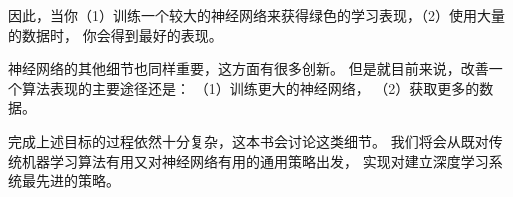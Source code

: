 因此，当你（1）训练一个较大的神经网络来获得绿色的学习表现，（2）使用大量的数据时， 你会得到最好的表现。

神经网络的其他细节也同样重要，这方面有很多创新。
但是就目前来说，改善一个算法表现的主要途径还是：
（1）训练更大的神经网络，
（2）获取更多的数据。

完成上述目标的过程依然十分复杂，这本书会讨论这类细节。
我们将会从既对传统机器学习算法有用又对神经网络有用的通用策略出发，
实现对建立深度学习系统最先进的策略。

